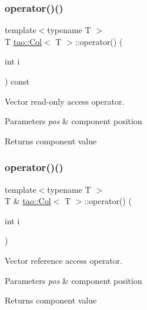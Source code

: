 \subsubsection{\texorpdfstring{operator()()}{operator()()}\hspace{0.1cm}{\footnotesize\ttfamily [1/2]}}
{\footnotesize\ttfamily template$<$typename T $>$ \\
T \mbox{\hyperlink{classtao_1_1_col}{tao\+::\+Col}}$<$ T $>$\+::operator() (\begin{DoxyParamCaption}\item[{int}]{i }\end{DoxyParamCaption}) const}



Vector read-\/only access operator. 


\begin{DoxyParams}{Parameters}
{\em pos} & component position \\
\hline
\end{DoxyParams}
\begin{DoxyReturn}{Returns}
component value 
\end{DoxyReturn}
\mbox{\label{classtao_1_1_col_ad7f3279e2764f5e1b0762e62517e738a}} 
\subsubsection{\texorpdfstring{operator()()}{operator()()}\hspace{0.1cm}{\footnotesize\ttfamily [2/2]}}
{\footnotesize\ttfamily template$<$typename T $>$ \\
T \& \mbox{\hyperlink{classtao_1_1_col}{tao\+::\+Col}}$<$ T $>$\+::operator() (\begin{DoxyParamCaption}\item[{int}]{i }\end{DoxyParamCaption})}



Vector reference access operator. 


\begin{DoxyParams}{Parameters}
{\em pos} & component position \\
\hline
\end{DoxyParams}
\begin{DoxyReturn}{Returns}
component value 
\end{DoxyReturn}
\mbox{\label{classtao_1_1_col_a5c470640270acffdd3a33c9c99fd99ac}} 
